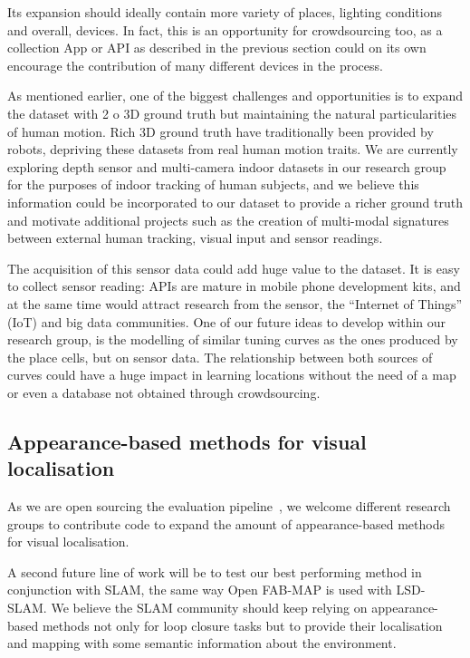 Its expansion should ideally contain more variety of places, lighting conditions and overall, devices. In fact, this is an opportunity for crowdsourcing too, as a collection App or API as described in the previous section could on its own encourage the contribution of many different devices in the process.

As mentioned earlier, one of the biggest challenges and opportunities is to expand the dataset with 2 o 3D ground truth but maintaining the natural particularities of human motion. Rich 3D ground truth have traditionally been provided by robots, depriving these datasets from real human motion traits. We are currently exploring depth sensor and multi-camera indoor datasets in our research group for the purposes of indoor tracking of human subjects, and we believe this information could be incorporated to our dataset to provide a richer ground truth and motivate additional projects such as the creation of multi-modal signatures between external human tracking, visual input and sensor readings.

The acquisition of this sensor data could add huge value to the dataset. It is easy to collect sensor reading: APIs are mature in mobile phone development kits, and at the same time would attract research from the sensor, the ``Internet of Things'' (IoT) and big data communities. One of our future ideas to develop within our research group, is the modelling of similar tuning curves as the ones produced by the place cells, but on sensor data. The relationship between both sources of curves could have a huge impact in learning locations without the need of a map or even a database not obtained through crowdsourcing.

\subsection{Appearance-based methods for visual localisation}
As we are open sourcing the evaluation pipeline~\cite{jose_rivera_rubio_2015_33762}, we welcome different research groups to contribute code to expand the amount of appearance-based methods for visual localisation.

A second future line of work will be to test our best performing method in conjunction with SLAM, the same way Open FAB-MAP is used with LSD-SLAM. We believe the SLAM community should keep relying on appearance-based methods not only for loop closure tasks but to provide their localisation and mapping with some semantic information about the environment.

